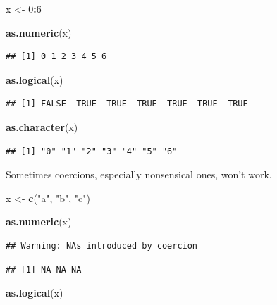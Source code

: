 \documentclass[
]{book}
\newenvironment{Shaded}{\begin{snugshade}}{\end{snugshade}}
\newcommand{\DecValTok}[1]{\textcolor[rgb]{0.00,0.00,0.81}{#1}}
\newcommand{\FunctionTok}[1]{\textcolor[rgb]{0.13,0.29,0.53}{\textbf{#1}}}
\newcommand{\NormalTok}[1]{#1}
\newcommand{\OtherTok}[1]{\textcolor[rgb]{0.56,0.35,0.01}{#1}}
\newcommand{\SpecialCharTok}[1]{\textcolor[rgb]{0.81,0.36,0.00}{\textbf{#1}}}
\newcommand{\StringTok}[1]{\textcolor[rgb]{0.31,0.60,0.02}{#1}}
\begin{document}
\begin{Shaded}
\begin{Highlighting}[]
\NormalTok{x }\OtherTok{\textless{}{-}} \DecValTok{0}\SpecialCharTok{:}\DecValTok{6}

\FunctionTok{as.numeric}\NormalTok{(x)}
\end{Highlighting}
\end{Shaded}

\begin{verbatim}
## [1] 0 1 2 3 4 5 6
\end{verbatim}

\begin{Shaded}
\begin{Highlighting}[]
\FunctionTok{as.logical}\NormalTok{(x)}
\end{Highlighting}
\end{Shaded}

\begin{verbatim}
## [1] FALSE  TRUE  TRUE  TRUE  TRUE  TRUE  TRUE
\end{verbatim}

\begin{Shaded}
\begin{Highlighting}[]
\FunctionTok{as.character}\NormalTok{(x)}
\end{Highlighting}
\end{Shaded}

\begin{verbatim}
## [1] "0" "1" "2" "3" "4" "5" "6"
\end{verbatim}

Sometimes coercions, especially nonsensical ones, won't work.

\begin{Shaded}
\begin{Highlighting}[]
\NormalTok{x }\OtherTok{\textless{}{-}} \FunctionTok{c}\NormalTok{(}\StringTok{"a"}\NormalTok{, }\StringTok{"b"}\NormalTok{, }\StringTok{"c"}\NormalTok{)}

\FunctionTok{as.numeric}\NormalTok{(x)}
\end{Highlighting}
\end{Shaded}

\begin{verbatim}
## Warning: NAs introduced by coercion
\end{verbatim}

\begin{verbatim}
## [1] NA NA NA
\end{verbatim}

\begin{Shaded}
\begin{Highlighting}[]
\FunctionTok{as.logical}\NormalTok{(x)}
\end{Highlighting}
\end{Shaded}
\end{document}
